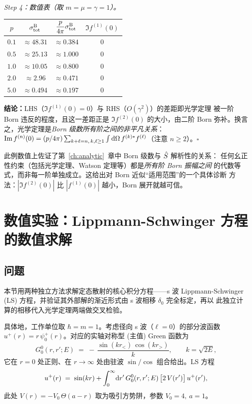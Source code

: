 \emph{Step 4：数值表（取 $m=\mu=\gamma=1$）。}\quad
\begin{center}
\begin{tabular}{c|c|c|c}
$p$ & $\sigma_{\rm tot}^{\rm B}$ & $\dfrac{p}{4\pi}\sigma_{\rm tot}^{\rm B}$
   & $\Im f^{(1)}(0)$ \\\hline
$0.1$ & $\approx 48.31$ & $\approx 0.384$ & $0$\\
$0.5$ & $\approx 25.13$ & $\approx 1.000$ & $0$\\
$1.0$ & $\approx 10.05$ & $\approx 0.800$ & $0$\\
$2.0$ & $\approx 2.96$  & $\approx 0.471$ & $0$\\
$5.0$ & $\approx 0.494$ & $\approx 0.197$ & $0$\\
\end{tabular}
\end{center}
\textbf{结论：}LHS（$\Im f^{(1)}(0)=0$）与 RHS（$O(\gamma^2)$）的差距即光学定理
被一阶 Born 违反的程度，且这一差距正是 $\Im f^{(2)}(0)$ 的大小，由二阶 Born
弥补。换言之，光学定理是\emph{Born 级数所有阶之间的非平凡关系}：
$\Im f^{(n)}(0) = (p/4\pi)\sum_{k+\ell=n,\,k,\ell\ge 1}\int\mathrm{d}\Omega\,
f^{(k)*} f^{(\ell)}$（注意 $n\ge 2$）。\hfill$\square$

\begin{remark}
此例数值上佐证了第~\ref{ch:analytic}~章中 Born 级数与 $\hat{S}$ 解析性的关系：
任何幺正性约束（包括光学定理、Watson 定理等）都是\emph{所有阶 Born 振幅之间}
的代数等式，而非每一阶单独成立。这给出对 Born 近似``适用范围''的一个具体诊断
方法：$|\Im f^{(2)}(0)|$ 比 $|f^{(1)}(0)|$ 越小，Born 展开就越可信。
\end{remark}



\section{数值实验：Lippmann-Schwinger 方程的数值求解}\label{sec:numexp-ch09}

\subsection*{问题}
本节用两种独立方法求解定态散射的核心积分方程——s 波 Lippmann-Schwinger
(LS) 方程，并验证其外部解的渐近形式由 s 波相移 $\delta_0$ 完全标定，再以
此独立计算的相移代入光学定理两端做交叉检验。

具体地，工作单位取 $\hbar = m = 1$。考虑径向 s 波（$\ell=0$）的部分波函数
$u^+(r) = r\,\psi^+_0(r)$。对应的实轴对称型 (主值) Green 函数为
\begin{equation}
  G^0_0(r,r';E) \;=\; -\,\frac{\sin(k r_<)\,\cos(k r_>)}{k},
  \qquad k = \sqrt{2 E},
  \label{eq:numex-G0sym}
\end{equation}
它在 $r=0$ 处正则、在 $r\to\infty$ 处由驻波 $\sin/\cos$ 组合给出。LS 方程
\begin{equation}
  u^+(r) \;=\; \sin(kr) + \int_0^\infty\!\mathrm{d} r'\,
  G^0_0(r,r';E)\,\bigl[2\,V(r')\bigr]\,u^+(r'),
  \label{eq:numex-LS-radial}
\end{equation}
此处 $V(r) = -V_0\,\Theta(a-r)$ 取为吸引方势阱，参数 $V_0=4,\ a=1$。

